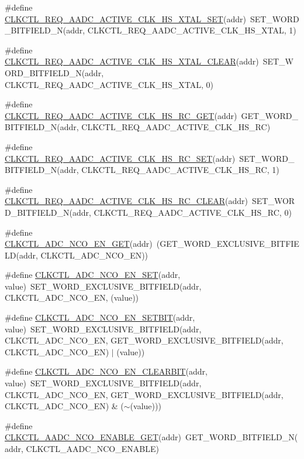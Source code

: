 \begin{DoxyCompactItemize}
\item 
\#define \hyperlink{a00544_a822021f2b7958fa2eddec826caebe0a1}{CLKCTL\_\-REQ\_\-AADC\_\-ACTIVE\_\-CLK\_\-HS\_\-XTAL\_\-SET}(addr)~SET\_\-WORD\_\-BITFIELD\_\-N(addr, CLKCTL\_\-REQ\_\-AADC\_\-ACTIVE\_\-CLK\_\-HS\_\-XTAL, 1)
\item 
\#define \hyperlink{a00544_ab8e9fe6b4ad88714a46c7f535cc1c8ff}{CLKCTL\_\-REQ\_\-AADC\_\-ACTIVE\_\-CLK\_\-HS\_\-XTAL\_\-CLEAR}(addr)~SET\_\-WORD\_\-BITFIELD\_\-N(addr, CLKCTL\_\-REQ\_\-AADC\_\-ACTIVE\_\-CLK\_\-HS\_\-XTAL, 0)
\item 
\#define \hyperlink{a00544_a1ff9d6e23dff0efaa026305108b01f4e}{CLKCTL\_\-REQ\_\-AADC\_\-ACTIVE\_\-CLK\_\-HS\_\-RC\_\-GET}(addr)~GET\_\-WORD\_\-BITFIELD\_\-N(addr, CLKCTL\_\-REQ\_\-AADC\_\-ACTIVE\_\-CLK\_\-HS\_\-RC)
\item 
\#define \hyperlink{a00544_afe1eee879edfe7f985dfc5373d10f739}{CLKCTL\_\-REQ\_\-AADC\_\-ACTIVE\_\-CLK\_\-HS\_\-RC\_\-SET}(addr)~SET\_\-WORD\_\-BITFIELD\_\-N(addr, CLKCTL\_\-REQ\_\-AADC\_\-ACTIVE\_\-CLK\_\-HS\_\-RC, 1)
\item 
\#define \hyperlink{a00544_a75c9071d8e559ccea53e711c29805349}{CLKCTL\_\-REQ\_\-AADC\_\-ACTIVE\_\-CLK\_\-HS\_\-RC\_\-CLEAR}(addr)~SET\_\-WORD\_\-BITFIELD\_\-N(addr, CLKCTL\_\-REQ\_\-AADC\_\-ACTIVE\_\-CLK\_\-HS\_\-RC, 0)
\item 
\#define \hyperlink{a00544_a8b6774bd2dae2d6239d0e5c4284def06}{CLKCTL\_\-ADC\_\-NCO\_\-EN\_\-GET}(addr)~(GET\_\-WORD\_\-EXCLUSIVE\_\-BITFIELD(addr, CLKCTL\_\-ADC\_\-NCO\_\-EN))
\item 
\#define \hyperlink{a00544_a8f218519bdc00114670da093e7766132}{CLKCTL\_\-ADC\_\-NCO\_\-EN\_\-SET}(addr, value)~SET\_\-WORD\_\-EXCLUSIVE\_\-BITFIELD(addr, CLKCTL\_\-ADC\_\-NCO\_\-EN, (value))
\item 
\#define \hyperlink{a00544_aa7912cfd7cc20bd1a736e6382f03aef0}{CLKCTL\_\-ADC\_\-NCO\_\-EN\_\-SETBIT}(addr, value)~SET\_\-WORD\_\-EXCLUSIVE\_\-BITFIELD(addr, CLKCTL\_\-ADC\_\-NCO\_\-EN, GET\_\-WORD\_\-EXCLUSIVE\_\-BITFIELD(addr, CLKCTL\_\-ADC\_\-NCO\_\-EN) $|$ (value))
\item 
\#define \hyperlink{a00544_a2752588b6150b5c5b7627024d0057fce}{CLKCTL\_\-ADC\_\-NCO\_\-EN\_\-CLEARBIT}(addr, value)~SET\_\-WORD\_\-EXCLUSIVE\_\-BITFIELD(addr, CLKCTL\_\-ADC\_\-NCO\_\-EN, GET\_\-WORD\_\-EXCLUSIVE\_\-BITFIELD(addr, CLKCTL\_\-ADC\_\-NCO\_\-EN) \& ($\sim$(value)))
\item 
\#define \hyperlink{a00544_adce1b3835e8c3ac5c58bfe13d2f85b8c}{CLKCTL\_\-AADC\_\-NCO\_\-ENABLE\_\-GET}(addr)~GET\_\-WORD\_\-BITFIELD\_\-N(addr, CLKCTL\_\-AADC\_\-NCO\_\-ENABLE)

\end{DoxyCompactItemize}
